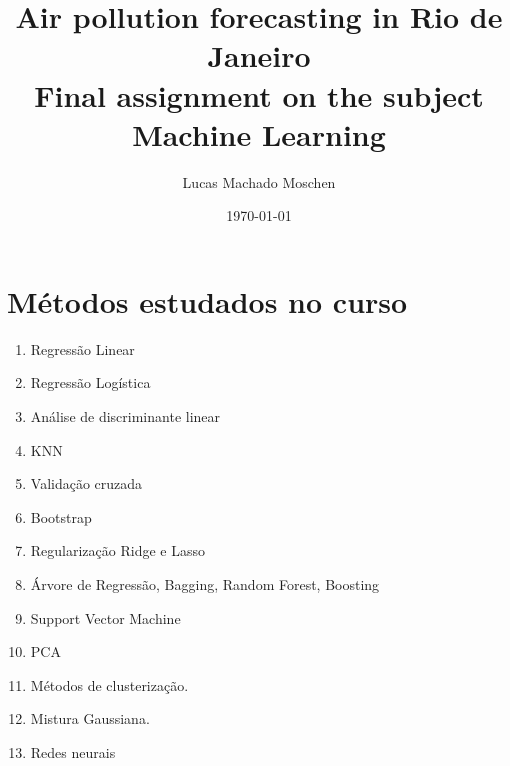 \documentclass[10pt, twocolumn]{article}
\title{Air pollution forecasting in Rio de Janeiro
        \vspace{2mm}
       \\\large Final assignment on the subject Machine Learning 
}
\author{Lucas Machado Moschen}
\affil{School of Applied Mathematics, \\ Fundação Getulio Vargas}
\date{\today}
\begin{document}
\setcounter{num}{0}

\twocolumn[
    \begin{@twocolumnfalse}

        \maketitle

        \begin{abstract}
            
        \end{abstract}

        \vspace{7mm}

    \end{@twocolumnfalse}
]








\newpage

\section*{Métodos estudados no curso}

\begin{enumerate}
    \item Regressão Linear
    \item Regressão Logística 
    \item Análise de discriminante linear 
    \item KNN
    \item Validação cruzada 
    \item Bootstrap
    \item Regularização Ridge e Lasso
    \item Árvore de Regressão, Bagging, Random Forest, Boosting 
    \item Support Vector Machine
    \item PCA 
    \item Métodos de clusterização. 
    \item Mistura Gaussiana.
    \item Redes neurais
\end{enumerate}

    \newpage



\twocolumn[
    \begin{@twocolumnfalse}
         
    \end{@twocolumnfalse}
]
\end{document}
